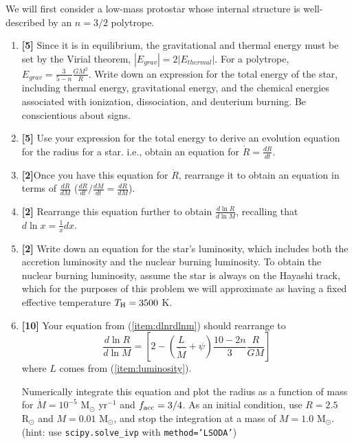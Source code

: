 \documentclass{article}
\newcommand{\msun}{\ensuremath{\mathrm{M}_\odot}\xspace}
\newcommand{\rsun}{\ensuremath{\mathrm{R}_\odot}\xspace}
\begin{document}
\begin{enumerate}
 We will first consider a low-mass protostar whose internal structure is
 well-described by an $n=3/2$ polytrope.


\begin{enumerate}
    \item  \textbf{[5]}
 Since it is in equilibrium, the gravitational and thermal energy
 must be set by the Virial theorem, $|E_{grav}| =2 |E_{thermal}|$.
 For a polytrope, $E_{grav} = \frac{3}{5-n} \frac{G M^2}{R}$.
 Write down an expression for the total energy of the star,
 including thermal energy, gravitational energy, and the chemical energies
 associated with ionization, dissociation, and deuterium burning.
    Be conscientious about signs.
\item \textbf{[5]} Use your expression for the total energy to derive an evolution equation
    for the radius for a star.  i.e., obtain an equation for $\dot{R}=\frac{dR}{dt}$.
\item \textbf{[2]}Once you have this equation for $\dot{R}$, rearrange it to obtain an equation in terms
    of $\frac{dR}{dM}$ ($\frac{dR}{dt} / \frac{dM}{dt} = \frac{dR}{dM}$).
\item \textbf{[2]}
    \label{item:dlnrdlnm}
    Rearrange this equation further to obtain $\frac{d \ln R}{d \ln M}$,
    recalling that $d \ln x = \frac{1}{x}dx$.
\item \textbf{[2]}
    \label{item:luminosity}
    Write down an equation for the star's luminosity, which includes both the accretion 
    luminosity and the nuclear burning luminosity. 
    To obtain the nuclear burning luminosity,  assume the star is always on the Hayashi track,
    which for the purposes of this problem we will approximate as having a
    fixed effective temperature $T_{\rm H} = 3500$ K.
\item \textbf{[10]}
    Your equation from (\ref{item:dlnrdlnm}) should rearrange to
\begin{equation}
    \frac{d \ln R}{d \ln M} = \left[2 - \left(\frac{L}{\dot{M}}+\psi\right)\frac{10-2n}{3}\frac{R}{GM} \right]
\end{equation}
where $L$ comes from (\ref{item:luminosity}).

    Numerically integrate this equation and plot the radius as a function of
    mass for $\dot{M} = 10^{-5}$ $\msun$ yr$^{-1}$ and $f_{\rm acc}=3/4$. As an
    initial condition, use $R=2.5$ $\rsun$ and $M=0.01$ $\msun$, and stop the
    integration at a mass of $M=1.0$ $\msun$.
    (hint: use \texttt{scipy.solve\_ivp} with \texttt{method='LSODA'})


\end{enumerate}
\end{enumerate}
\end{document}
